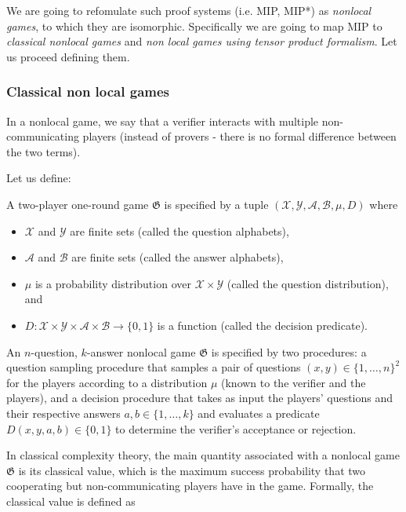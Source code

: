 We are going to refomulate such proof systems (i.e. MIP, MIP*) as \emph{nonlocal games}, to which they are isomorphic. Specifically we are going to map MIP to \emph{classical nonlocal games} and \emph{non local games using tensor product formalism}. Let us proceed defining them.
\subsubsection{Classical non local games}

In a nonlocal game, we say that a verifier interacts with multiple non-communicating players (instead of provers - there is no formal difference between the two terms). 

Let us define: 

\begin{defn} A two-player one-round game $\mathfrak{G}$ is specified by a tuple $(\mathcal{X}, \mathcal{Y}, \mathcal{A}, \mathcal{B}, \mu, D)$ where
    \begin{itemize}
        \item $\mathcal{X}$ and $\mathcal{Y}$ are finite sets (called the question alphabets),
        \item $\mathcal{A}$ and $\mathcal{B}$ are finite sets (called the answer alphabets),
        \item $\mu$ is a probability distribution over $\mathcal{X} \times \mathcal{Y}$ (called the question distribution), and
        \item $D: \mathcal{X} \times \mathcal{Y} \times \mathcal{A} \times \mathcal{B} \rightarrow\{0,1\}$ is a function (called the decision predicate).
    \end{itemize}
\end{defn}

An $n$-question, $k$-answer nonlocal game $\mathfrak{G}$ is specified by two procedures: a question sampling procedure that samples a pair of questions $(x, y) \in\{1, \ldots, n\}^{2}$ for the players according to a distribution $\mu$ (known to the verifier and the players), and a decision procedure that takes as input the players' questions and their respective answers $a, b \in\{1, \ldots, k\}$ and evaluates a predicate $D(x, y, a, b) \in\{0,1\}$ to determine the verifier's acceptance or rejection.

In classical complexity theory, the main quantity associated with a nonlocal game $\mathfrak{G}$ is its classical value, which is the maximum success probability that two cooperating but non-communicating players have in the game. Formally, the classical value is defined as

